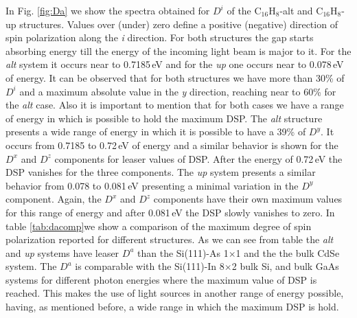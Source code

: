 \documentclass[pss]{wiley2sp} %
\begin{document}
In Fig. \ref{fig:Da} we show the spectra obtained for
{$D^{i}$} of the C$_{16}$H$_{8}$-alt and C$_{16}$H$_{8}$-up structures. Values over
(under) zero define a positive (negative) direction of spin polarization along
the \emph{i} direction. 
For both structures the gap starts absorbing energy till the energy of the incoming light beam is major to it. For the \emph{alt} system it occurs near to 0.7185\,eV and for the \emph{up} one occurs near to 0.078\,eV of energy. 
It can be observed that for both structures we have
more than 30\% of {$D^{i}$} and a maximum absolute value in the \emph{y} direction,
reaching near to 60\% for the \emph{alt} case. 
Also it is important to mention that for both cases we have a range of energy in which is possible to hold the maximum DSP. 
The \emph{alt} structure presents a wide range of energy in which it is possible to have a 39\% of $D^{y}$.  It occurs from  0.7185 to 0.72\,eV of energy and a similar behavior is shown for the  $D^{x}$ and $D^{z}$ components for leaser values of DSP. After the energy of 0.72\,eV the DSP vanishes for the three components. The \emph{up} system presents a similar behavior from 0.078 to 0.081\,eV presenting a minimal variation in the $D^{y}$ component. Again, the $D^{x}$ and $D^{z}$ components have their own maximum values for this range of energy and after 0.081\,eV the DSP slowly vanishes to zero. In table \ref{tab:dacomp}we show a comparison of the maximum degree of spin polarization reported for different structures. As we can see from table the \emph{alt} and \emph{up} systems have leaser $D^{a}$ than the Si(111)-As 1$\times$1 and the the bulk CdSe system. The $D^{a}$ is comparable with the Si(111)-In 8$\times$2 bulk Si, and bulk GaAs systems for different photon energies where the maximum value of DSP is reached. This makes the use of light sources in another range of energy possible, having, as mentioned before, a wide range in which the maximum DSP is hold.
\end{document}
